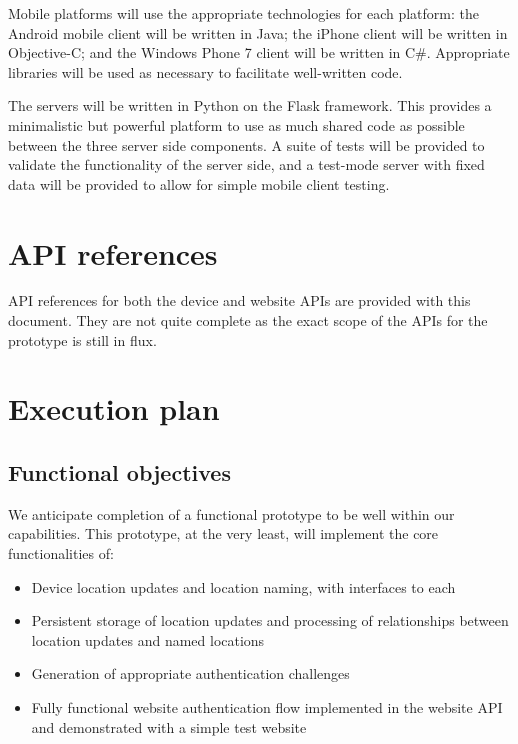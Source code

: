 \documentclass[11pt]{article} %
\begin{document}
Mobile platforms will use the appropriate technologies for each platform: the Android mobile client will be written in Java; the iPhone client will be written in Objective-C; and the Windows Phone 7 client will be written in C\#. Appropriate libraries will be used as necessary to facilitate well-written code.

The servers will be written in Python on the Flask framework. This provides a minimalistic but powerful platform to use as much shared code as possible between the three server side components. A suite of tests will be provided to validate the functionality of the server side, and a test-mode server with fixed data will be provided to allow for simple mobile client testing.

\section{API references}
API references for both the device and website APIs are provided with this document. They are not quite complete as the exact scope of the APIs for the prototype is still in flux.

\section{Execution plan}
\subsection{Functional objectives}
We anticipate completion of a functional prototype to be well within our capabilities. This prototype, at the very least, will implement the core functionalities of:

\begin{itemize}
\item Device location updates and location naming, with interfaces to each
\item Persistent storage of location updates and processing of relationships between location updates and named locations
\item Generation of appropriate authentication challenges
\item Fully functional website authentication flow implemented in the website API and demonstrated with a simple test website

\end{itemize}
\end{document}
